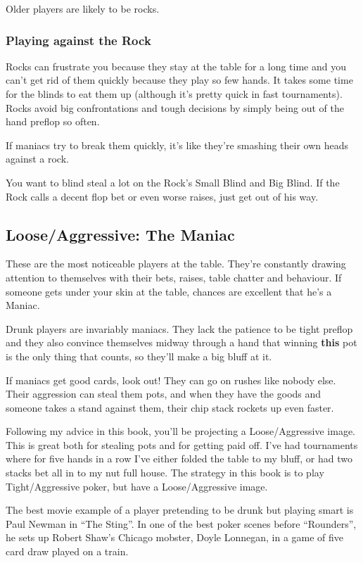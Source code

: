 Older players are likely to be rocks.

\subsubsection{Playing against the Rock}

Rocks can frustrate you because they stay at the table for a long time
and you can't get rid of them quickly because they play so few hands.
It takes some time for the blinds to eat them up (although it's
pretty quick in fast tournaments). Rocks avoid big confrontations
and tough decisions by simply being out of the hand preflop so often.

If maniacs try to break them quickly,
it's like they're smashing their own heads against a rock.

You want to blind steal a lot on the Rock's Small Blind and Big Blind.
If the Rock calls a decent flop bet or even worse raises, just get
out of his way.

\subsection{Loose/Aggressive: The Maniac}

These are the most noticeable players at the table. They're constantly
drawing attention to themselves with their bets, raises, table chatter
and behaviour. If someone gets under your skin at the table, chances
are excellent that he's a Maniac.

Drunk players are invariably maniacs. They lack the patience to be
tight preflop and they also convince themselves midway through a
hand that winning \textbf{this} pot is the only thing that counts, so
they'll make a big bluff at it.

If maniacs get good cards, look out! They can go on rushes like
nobody else. Their aggression can steal them pots, and when
they have the goods and someone takes a stand against them, their
chip stack rockets up even faster.

Following my advice in this book, you'll be projecting a Loose/Aggressive
image. This is great both for stealing pots and for getting paid off.
I've had tournaments where for five hands in a row I've either folded
the table to my bluff, or had two stacks bet all in to my nut full house.
The strategy in this book is to play Tight/Aggressive poker, but
have a Loose/Aggressive image.

The best movie example of a player pretending to be drunk but playing 
smart is Paul Newman in ``The Sting''. In one of the best poker scenes 
before ``Rounders'', he sets up Robert Shaw's Chicago mobster, 
Doyle Lonnegan, in a game of five card draw played on a train.

